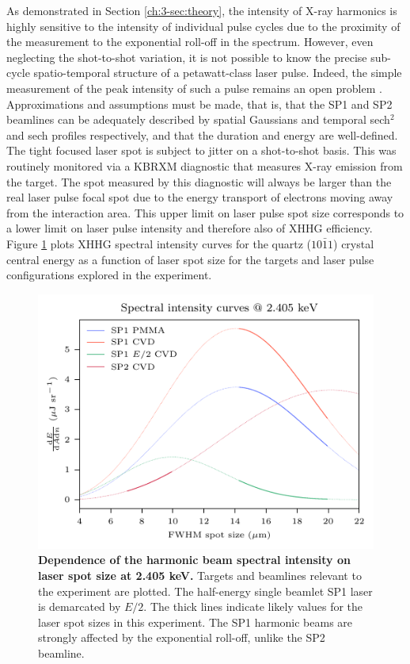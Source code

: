 As demonstrated in Section \ref{ch:3-sec:theory}, the intensity of X-ray harmonics is highly sensitive to the intensity of individual pulse cycles due to the proximity of the measurement to the exponential roll-off in the spectrum. However, even neglecting the shot-to-shot variation, it is not possible to know the precise sub-cycle spatio-temporal structure of a petawatt-class laser pulse. Indeed, the simple measurement of the peak intensity of such a pulse remains an open problem \cite{perevalovLaserPeelerRegime2023,ouatuIonizationStatesMultipetawatt2022}. Approximations and assumptions must be made, that is, that the SP1 and SP2 beamlines can be adequately described by spatial Gaussians and temporal sech$^2$ and sech profiles respectively, and that the duration and energy are well-defined. The tight focused laser spot is subject to jitter on a shot-to-shot basis. This was routinely monitored via a KBRXM diagnostic that measures X-ray emission from the target. The spot measured by this diagnostic will always be larger than the real laser pulse focal spot due to the energy transport of electrons moving away from the interaction area. This upper limit on laser pulse spot size corresponds to a lower limit on laser pulse intensity and therefore also of XHHG efficiency. Figure \ref{fig:orionintensitycurves} plots XHHG spectral intensity curves for the quartz ($10\bar{1}1$) crystal central energy as a function of laser spot size for the targets and laser pulse configurations explored in the experiment. 
\begin{figure}
	\centering
	\includegraphics{figures/orion/orion_intensity_curves}
	\caption[Dependence of the harmonic beam spectral intensity on laser spot size at 2.405 keV.]{\textbf{Dependence of the harmonic beam spectral intensity on laser spot size at 2.405 keV.} Targets and beamlines relevant to the experiment are plotted. The half-energy single beamlet SP1 laser is demarcated by $E/2$. The thick lines indicate likely values for the laser spot sizes in this experiment. The SP1 harmonic beams are strongly affected by the exponential roll-off, unlike the SP2 beamline.}
	\label{fig:orionintensitycurves}
\end{figure}
